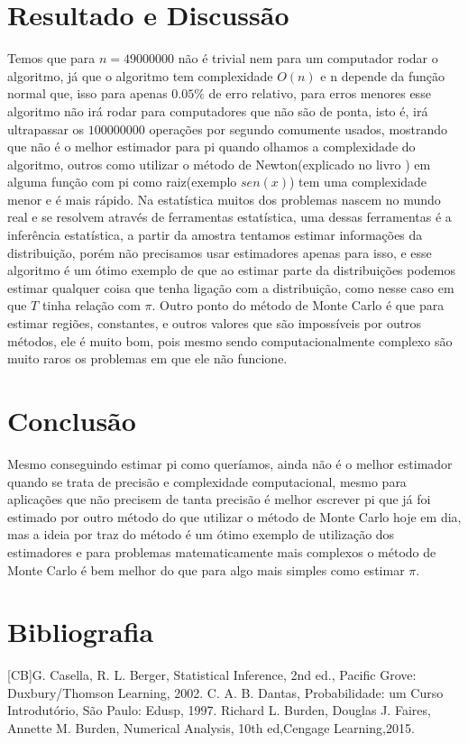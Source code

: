 \documentclass{article}
\begin{document}
\section{Resultado e Discussão}
Temos que para $n=49000000$ não é trivial nem para um computador rodar o algoritmo, já que o algoritmo tem complexidade $O(n)$ e n depende da função normal que, isso para apenas $0.05\%$ de erro relativo, para erros menores esse algoritmo não irá rodar para computadores que não são de ponta, isto é, irá ultrapassar os $100000000$ operações por segundo comumente usados, mostrando que não é o melhor estimador para pi quando olhamos a complexidade do algoritmo, outros como utilizar o método de Newton(explicado no livro ) em alguma função com pi como raiz(exemplo $sen(x)$) tem uma complexidade menor e é mais rápido.
\newline
Na estatística muitos dos problemas nascem no mundo real e se resolvem através de ferramentas estatística, uma dessas ferramentas é a inferência estatística, a partir da amostra tentamos estimar informações da distribuição, porém não precisamos usar estimadores apenas para isso, e esse algoritmo é um ótimo exemplo de que ao estimar parte da distribuições podemos estimar qualquer coisa que tenha ligação com a distribuição, como nesse caso em que $T$ tinha relação com $\pi$.
\newline
Outro ponto do método de Monte Carlo é que para estimar regiões, constantes, e outros valores que são impossíveis por outros métodos, ele é muito bom, pois mesmo sendo computacionalmente complexo são muito raros os problemas em que ele não funcione.
\section{Conclusão}
Mesmo conseguindo estimar pi como queríamos,  ainda não é o melhor estimador quando se trata de precisão e complexidade computacional, mesmo para aplicações que não precisem de tanta precisão é melhor escrever pi que já foi estimado por outro método do que utilizar o método de Monte Carlo hoje em dia, mas a ideia por traz do método é um ótimo exemplo de utilização dos estimadores e para problemas matematicamente mais complexos o método de Monte Carlo é bem melhor do que para algo mais simples como estimar $\pi$.  
\section{Bibliografia}
[CB]G. Casella, R. L. Berger, Statistical Inference, 2nd ed., Pacific Grove: Duxbury/Thomson Learning, 2002.
\newline
[CD]C. A. B. Dantas, Probabilidade: um Curso Introdutório, São Paulo: Edusp, 1997.
\newline 
[BF]Richard L. Burden, Douglas J. Faires, Annette M. Burden, Numerical Analysis, 10th ed,Cengage Learning,2015.
\newline
\end{document}

